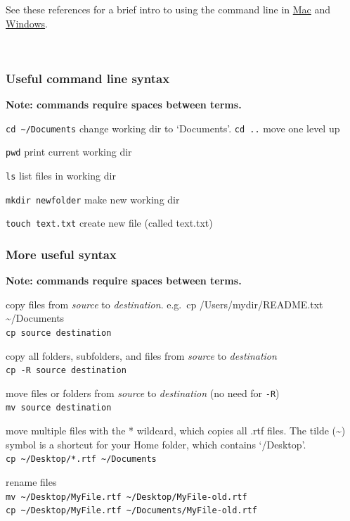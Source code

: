 \documentclass[10,portrait]{article}
\begin{document}
See these references for a brief intro to using the command line in
\href{https://macpaw.com/how-to/use-terminal-on-mac}{Mac} and
\href{https://www.computerhope.com/issues/chusedos.htm}{Windows}.

~

\subsubsection{Useful command line
syntax}\label{useful-command-line-syntax}

\textbf{Note: commands require spaces between terms.}

\texttt{cd\ \textasciitilde{}/Documents} change working dir to
`Documents'. \texttt{cd\ ..} move one level up

\texttt{pwd} print current working dir

\texttt{ls} list files in working dir

\texttt{mkdir\ newfolder} make new working dir

\texttt{touch\ text.txt} create new file (called text.txt)

\subsubsection{More useful syntax}\label{more-useful-syntax}

\textbf{Note: commands require spaces between terms.}

copy files from \emph{source} to \emph{destination}. e.g.~cp
/Users/mydir/README.txt \textasciitilde{}/Documents\\
\texttt{cp\ source\ destination}

copy all folders, subfolders, and files from \emph{source} to
\emph{destination}\\
\texttt{cp\ -R\ source\ destination}

move files or folders from \emph{source} to \emph{destination} (no need
for \texttt{-R})\\
\texttt{mv\ source\ destination}

move multiple files with the * wildcard, which copies all .rtf files.
The tilde (\textasciitilde{}) symbol is a shortcut for your Home folder,
which contains `/Desktop'.\\
\texttt{cp\ \textasciitilde{}/Desktop/*.rtf\ \textasciitilde{}/Documents}

rename files\\
\texttt{mv\ \textasciitilde{}/Desktop/MyFile.rtf\ \textasciitilde{}/Desktop/MyFile-old.rtf}\\
\texttt{cp\ \textasciitilde{}/Desktop/MyFile.rtf\ \textasciitilde{}/Documents/MyFile-old.rtf}
\end{document}
